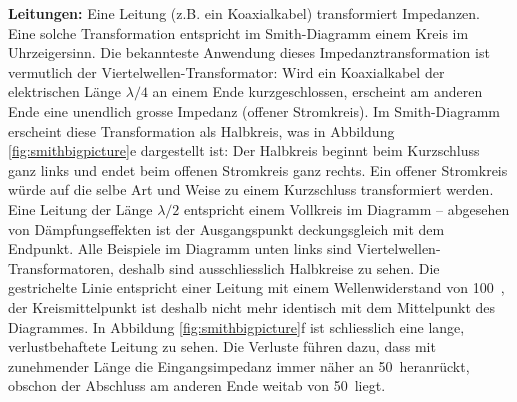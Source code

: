 \documentclass[twoside,a4paper,11pt,halfparskip,DIV=11,notitlepage]{scrartcl}
\begin{document}
\textbf{Leitungen:} Eine Leitung (z.B. ein Koaxialkabel) transformiert Impedanzen. Eine solche Transformation
entspricht im Smith-Diagramm einem Kreis im Uhrzeigersinn.
Die bekannteste Anwendung dieses Impedanztransformation ist vermutlich der Viertelwellen-Transformator: Wird ein
Koaxialkabel der elektrischen Länge $\lambda/4$ an einem Ende kurzgeschlossen, erscheint am anderen Ende eine
unendlich grosse Impedanz (offener Stromkreis). Im Smith-Diagramm erscheint diese Transformation als Halbkreis,
was in Abbildung \ref{fig:smithbigpicture}e dargestellt ist: Der Halbkreis beginnt beim Kurzschluss
ganz links und endet beim offenen Stromkreis ganz rechts. Ein offener Stromkreis würde auf die selbe Art und
Weise zu einem Kurzschluss transformiert werden. Eine Leitung der Länge $\lambda/2$ entspricht einem Vollkreis
im Diagramm -- abgesehen von Dämpfungseffekten ist der Ausgangspunkt deckungsgleich mit dem Endpunkt. Alle
Beispiele im Diagramm unten links sind Viertelwellen-Transformatoren, deshalb sind ausschliesslich Halbkreise
zu sehen.  Die gestrichelte Linie entspricht einer Leitung mit einem Wellenwiderstand von 100~\Ohm, der
Kreismittelpunkt ist deshalb nicht mehr identisch mit dem Mittelpunkt des Diagrammes. In Abbildung
\ref{fig:smithbigpicture}f ist schliesslich eine lange, verlustbehaftete Leitung zu sehen. Die Verluste führen
dazu, dass mit zunehmender Länge die Eingangsimpedanz immer näher an 50~\Ohm heranrückt, obschon der Abschluss
am anderen Ende weitab von 50~\Ohm liegt.
\end{document}
